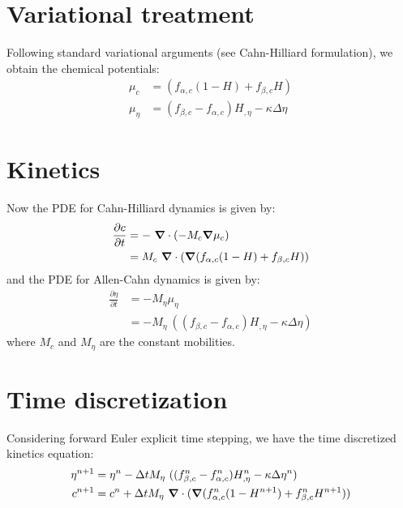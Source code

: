 \documentclass[10pt]{article}
\newcommand{\gv}[1]{\ensuremath{\mbox{\boldmath$ #1 $}}}
\newcommand{\grad}[1]{\gv{\nabla} #1}
\begin{document}
\section{Variational treatment}
Following standard variational arguments (see Cahn-Hilliard formulation), we obtain the chemical potentials:
\begin{align}
  \mu_{c}  &= (f_{\alpha,c}(1-H)+f_{\beta,c}H)  \\
  \mu_{\eta}  &= (f_{\beta,c}-f_{\alpha,c})H_{,\eta} - \kappa \Delta \eta 
\end{align}

\section{Kinetics}
Now the PDE for Cahn-Hilliard dynamics is given by:
\begin{align}
  \frac{\partial c}{\partial t} &= -~\grad \cdot (-M_c\grad \mu_c)\\
  &=M_c~\grad \cdot (\grad (f_{\alpha,c}(1-H)+f_{\beta,c}H)) 
  \end{align}
  and the PDE for Allen-Cahn dynamics is given by:
  \begin{align}
    \frac{\partial \eta}{\partial t} &= -M_\eta \mu_\eta \\
  &=-M_\eta ~ ((f_{\beta,c}-f_{\alpha,c})H_{,\eta} - \kappa \Delta \eta) 
\end{align}
where $M_c$ and $M_\eta$ are the constant mobilities. 

\section{Time discretization}
Considering forward Euler explicit time stepping, we have the time discretized kinetics equation:
\begin{align}
 \eta^{n+1} &= \eta^{n}  - \Delta t M_{\eta}~ ((f_{\beta,c}^n-f_{\alpha,c}^n)H_{,\eta}^n - \kappa \Delta \eta^n) \\
c^{n+1} &= c^{n}  + \Delta t M_{\eta}~\grad \cdot (\grad (f_{\alpha,c}^n(1-H^{n+1})+f_{\beta,c}^n H^{n+1}))
\end{align}
\end{document}
